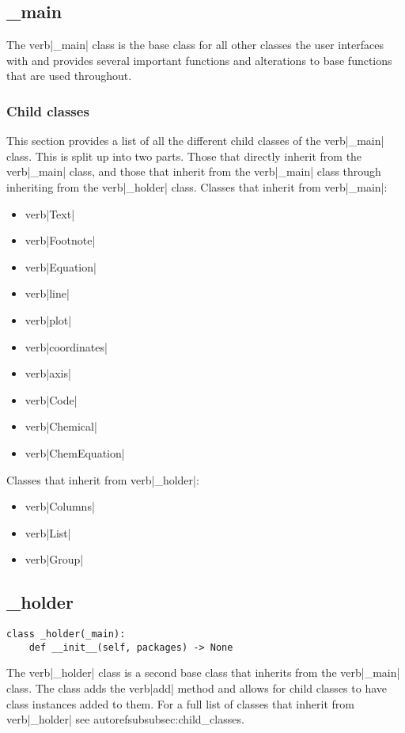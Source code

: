\documentclass{article}
\begin{document}
\subsection{\_main}\label{subsec:_main}
The verb|_main| class is the base class for all other classes the user interfaces with and provides several important functions and alterations to base functions that are used throughout.
\subsubsection{Child classes}\label{subsubsec:child_classes}
This section provides a list of all the different child classes of the verb|_main| class. This is split up into two parts. Those that directly inherit from the verb|_main| class, and those that inherit from the verb|_main| class through inheriting from the verb|_holder| class.
Classes that inherit from verb|_main|:\begin{multicols}{2}\begin{itemize}
\item verb|Text|
\item verb|Footnote|
\item verb|Equation|
\item verb|line|
\item verb|plot|
\item verb|coordinates|
\item verb|axis|
\item verb|Code|
\item verb|Chemical|
\item verb|ChemEquation|
\end{itemize}
\end{multicols}Classes that inherit from verb|_holder|:\begin{multicols}{2}\begin{itemize}
\item verb|Columns|
\item verb|List|
\item verb|Group|
\end{itemize}
\end{multicols}
\subsection{\_holder}\label{subsec:_holder}
\begin{verbatim}
class _holder(_main):
	def __init__(self, packages) -> None
\end{verbatim}
The verb|_holder| class is a second base class that inherits from the verb|_main| class. The class adds the verb|add| method and allows for child classes to have class instances added to them. For a full list of classes that inherit from verb|_holder| see autoref{subsubsec:child_classes}.
\end{document}
